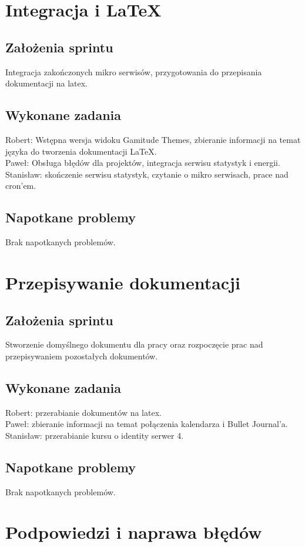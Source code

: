 \documentclass[a4paper,11pt]{report}
\begin{document}
\section {Integracja i LaTeX}
\subsection {Założenia sprintu}
Integracja zakończonych mikro serwisów, przygotowania do przepisania dokumentacji na latex.
\subsection {Wykonane zadania}
Robert: Wstępna wersja widoku Gamitude Themes, zbieranie informacji na temat języka do tworzenia dokumentacji LaTeX.\\
Paweł: Obsługa błędów dla projektów, integracja serwisu statystyk i energii.\\
Stanisław: skończenie serwisu statystyk, czytanie o mikro serwisach, prace nad cron'em.\\
\subsection {Napotkane problemy}
Brak napotkanych problemów.

\section {Przepisywanie dokumentacji}
\subsection {Założenia sprintu}
Stworzenie domyślnego dokumentu dla pracy oraz rozpoczęcie prac nad przepisywaniem pozostałych dokumentów.
\subsection {Wykonane zadania}
Robert: przerabianie dokumentów na latex.\\
Paweł: zbieranie informacji na temat połączenia kalendarza i Bullet Journal'a.\\
Stanisław: przerabianie kursu o identity serwer 4.\\
\subsection {Napotkane problemy}
Brak napotkanych problemów.


\section {Podpowiedzi i naprawa błędów}
\end{document}

